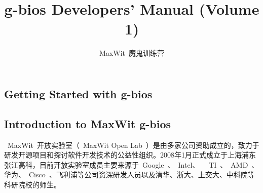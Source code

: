 \documentclass[a4paper,11pt]{book}
\title{g-bios Developers' Manual (Volume 1)}
\author{MaxWit~魔鬼训练营}
\begin{document}
\begin{CJK*}{UTF8}{gbsn}
\CJKtilde
\maketitle

\frontmatter
\tableofcontents

\mainmatter
\chapter{Getting Started with g-bios}

\section{Introduction to MaxWit g-bios}
~MaxWit~开放实验室（~MaxWit Open Lab~）是由多家公司资助成立的，致力于研发开源项目和探讨软件开发技术的公益性组织。2008年1月正式成立于上海浦东张江高科，目前开放实验室成员主要来源于~Google~、~Intel、~ ~TI~、~AMD~、华为、~Cisco~、飞利浦等公司资深研发人员以及清华、浙大、上交大、中科院等科研院校的师生。


\end{CJK*}
\end{document}
